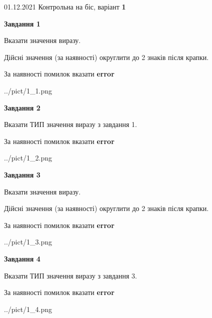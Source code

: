 \documentclass[11pt, ukrainian]{article}
\begin{document}
{01.12.2021 Контрольна на біс, варіант  \No \textbf { 1 }\par}
{
\begin {large}
{\begin {center}\textbf{Завдання 1}\end {center}}\par
Вказати значення виразу. \par
Дійсні значення (за наявності) округлити до 2 знаків після крапки. \par
За наявності помилок вказати \textbf{error}

\begin{center}
	{../pict/1_1.png}
\end{center}
\newpage

{\begin {center}\textbf{Завдання 2}\end {center}}\par
Вказати ТИП значення виразу з завдання 1. \par
За наявності помилок вказати \textbf{error}

\begin{center}
	{../pict/1_2.png}
\end{center}
\newpage

{\begin {center}\textbf{Завдання 3}\end {center}}\par
Вказати значення виразу. \par
Дійсні значення (за наявності) округлити до 2 знаків після крапки. \par
За наявності помилок вказати \textbf{error}

\begin{center}
	{../pict/1_3.png}
\end{center}
\newpage

{\begin {center}\textbf{Завдання 4}\end {center}}\par
Вказати ТИП значення виразу з завдання 3. \par
За наявності помилок вказати \textbf{error}

\begin{center}
	{../pict/1_4.png}
\end{center}
\newpage


\end{large}}
\end{document}

